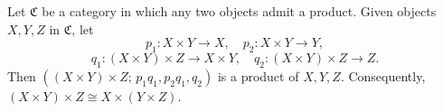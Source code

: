 Let $\mathfrak{C}$ be a category in which any two objects admit a product. Given objects $X, Y, Z$ in $\mathfrak{C}$, let
$$
p_1 : X \times Y \to X, \quad p_2 : X \times Y \to Y,
$$
$$
q_1 : (X \times Y) \times Z \to X \times Y, \quad q_2 : (X \times Y) \times Z \to Z.
$$
Then $((X \times Y) \times Z;\, p_1 q_1, p_2 q_1, q_2)$ is a product of $X, Y, Z$. Consequently, $(X \times Y) \times Z \cong X \times (Y \times Z)$.
